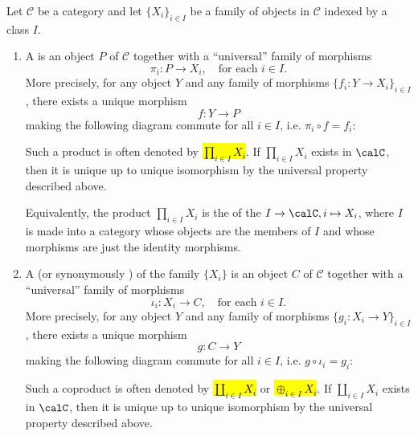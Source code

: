 \begin{definition} \label{definition:product_and_coproduct_of_objects_in_a_category}
Let $\mathcal{C}$ be a category and let $\{X_i\}_{i \in I}$ be a family of objects in $\mathcal{C}$ indexed by a class $I$. 
\begin{enumerate}
    \item A  is an object $P$ of $\mathcal{C}$ together with a ``universal'' family of morphisms
    $$\pi_i : P \to X_i, \quad \text{for each } i \in I. $$
    More precisely, for any object $Y$ and any family of morphisms $\{f_i : Y \to X_i\}_{i \in I}$, there exists a unique morphism
    $$f : Y \to P$$
    making the following diagram commute for all $i \in I$, i.e. $\pi_i \circ f = f_i$:
    \begin{center}
    \end{center}
    Such a product is often denoted by \hl{$\prod_{i \in I} X_i$}. If $\prod_{i \in I} X_i$ exists in $\calC$, then it is unique up to unique isomorphism by the universal property described above.
    
    Equivalently, the product $\prod_{i \in I} X_i$ is the  of the  $I \to \calC, i \mapsto X_i$, where $I$ is made into a category whose objects are the members of $I$ and whose morphisms are just the identity morphisms.


    \item A  (or synonymously ) of the family $\{X_i\}$ is an object $C$ of $\mathcal{C}$ together with a ``universal'' family of morphisms
    $$\iota_i : X_i \to C, \quad \text{for each } i \in I.$$
    More precisely, for any object $Y$ and any family of morphisms $\{g_i : X_i \to Y\}_{i \in I}$, there exists a unique morphism
    $$g : C \to Y$$
    making the following diagram commute for all $i \in I$, i.e. $g \circ \iota_i = g_i$:
    \begin{center}
    \end{center}
    Such a coproduct is often denoted by \hl{$\coprod_{i \in I} X_i$} or \hl{$\oplus_{i \in I} X_i$}. If $\coprod_{i \in I} X_i$ exists in $\calC$, then it is unique up to unique isomorphism by the universal property described above.


\end{enumerate}
\end{definition}
